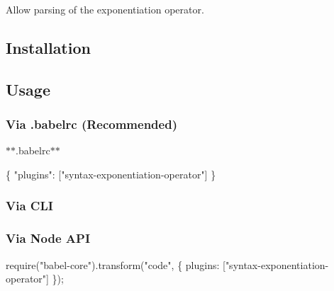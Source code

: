 Allow parsing of the exponentiation operator.

\subsection*{Installation}




\subsection*{Usage}

\subsubsection*{Via {\ttfamily .babelrc} (Recommended)}

$\ast$$\ast$.babelrc$\ast$$\ast$


\begin{DoxyCode}
\{
  "plugins": ["syntax-exponentiation-operator"]
\}
\end{DoxyCode}


\subsubsection*{Via C\+LI}




\subsubsection*{Via Node A\+PI}


\begin{DoxyCode}
require("babel-core").transform("code", \{
  plugins: ["syntax-exponentiation-operator"]
\});
\end{DoxyCode}
 